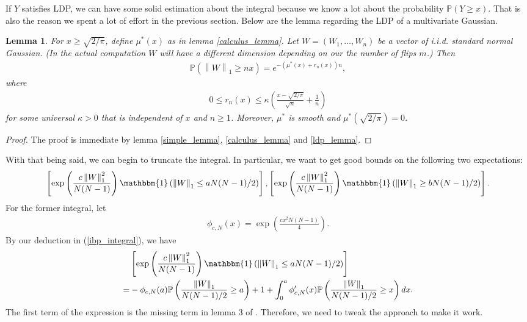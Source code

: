 \documentclass[10pt]{article}
\newcommand{\p}{\mathbb{P}}
\newcommand{\norm}[1]{\left\lVert#1\right\rVert}
\newtheorem{lemma}{\bf Lemma}
\newenvironment{Proof of lemma}{\noindent{\bf Proof of Lemma}}{\hfill$\Box$\newline}
\newenvironment{Proof of claim}{\noindent{\bf Proof of claim}}{\hfill$\Box$\newline}
\newenvironment{Proof of theorem}{\noindent{\bf Proof of Theorem}}{\hfill\scriptsize{$\Box$}\newline}
\newenvironment{Proof of theorems}{\noindent{\bf Proof of Theorems}}{\hfill$\Box$\newline}
\newenvironment{Proof of proposition}{\noindent{\bf Proof of Proposition}}{\hfill$\Box$\newline}
\newenvironment{Proof of propositions}{\noindent{\bf Proof of Propositions}}{\hfill$\Box$\newline}
\newenvironment{Proof of exercise}{\noindent{\it Proof of Exercise:}}{\hfill$\Box$}
\numberwithin{equation}{section}
\begin{document}
If $Y$ satisfies LDP, we can have some solid estimation about the integral because we know a lot about the probability $\p(Y\geq x)$. That is also the reason we spent a lot of effort in the previous section. Below are the lemma regarding the LDP of a multivariate Gaussian.
\begin{lemma} \label{ldp_lemma_2}
    For $x \geq \sqrt{2/\pi}$, define $\mu^*(x)$ as in lemma \ref{calculus_lemma}. Let $W = (W_1,\dots,W_n)$ be a vector of i.i.d. standard normal Gaussian. (In the actual computation $W$ will have a different dimension depending on our the number of flips $m$.) Then
    \begin{align}
        \p(\norm{W}_1 \geq nx) = e^{-(\mu^*(x) +r_n(x))n},
    \end{align}
    where
    \begin{align}
        0 \leq r_n(x) \leq \kappa \left(\frac{x - \sqrt{2/\pi}}{\sqrt{n}}+\frac{1}{n}\right)
    \end{align}
    for some universal $\kappa >0$ that is independent of $x$ and $n \geq 1$. Moreover, $\mu^*$ is smooth and $\mu^*(\sqrt{2/\pi}) = 0$.
\end{lemma}
\begin{proof}
    The proof is immediate by lemma \ref{simple_lemma}, \ref{calculus_lemma} and \ref{ldp_lemma}.
\end{proof}
With that being said, we can begin to truncate the integral. In particular, we want to get good bounds on the following two expectations:
\begin{align}
    \left[ \exp \left(\frac{c\norm{W}^2_1}{N(N-1)}\right) \mathbbm{1}\left(\norm{W}_1 \leq aN(N-1)/2\right)\right], \left[ \exp \left(\frac{c\norm{W}^2_1}{N(N-1)}\right) \mathbbm{1}\left(\norm{W}_1 \geq bN(N-1)/2\right)\right].
\end{align}
For the former integral, let 
\begin{align} \label{phicn_def}
    \phi_{c,N}(x) = \exp\left(\frac{cx^2N(N-1)}{4}\right).
\end{align}
By our deduction in (\ref{ibp_integral}), we have
\begin{align}
    &\left[ \exp \left(\frac{c\norm{W}^2_1}{N(N-1)}\right) \mathbbm{1}\left(\norm{W}_1 \leq aN(N-1)/2\right)\right] \nonumber \\
    =&-\phi_{c,N}(a)\p\left(\frac{\norm{W}_1}{N(N-1)/2} \geq a\right) + 1 + \int_{0}^{a} \phi_{c,N}'(x) \p\left(\frac{\norm{W}_1}{N(N-1)/2} \geq x\right)dx.
\end{align}
The first term of the expression is the missing term in lemma 3 of \cite{SK_optimal}. Therefore, we need to tweak the approach to make it work. 
\end{document}
